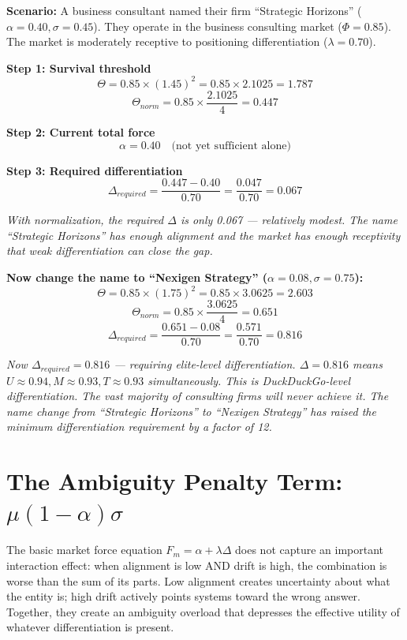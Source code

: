 \documentclass[12pt, openany]{book}
\theoremstyle{thmstyle}
\theoremstyle{defstyle}
\begin{document}
\begin{calcbox}
\textbf{Scenario:} A business consultant named their firm ``Strategic Horizons'' ($\alpha = 0.40, \sigma = 0.45$). They operate in the business consulting market ($\Phi = 0.85$). The market is moderately receptive to positioning differentiation ($\lambda = 0.70$).

\vspace{6pt}
\textbf{Step 1: Survival threshold}
\[
\Theta = 0.85 \times (1.45)^2 = 0.85 \times 2.1025 = 1.787
\]
\[
\Theta_{norm} = 0.85 \times \frac{2.1025}{4} = 0.447
\]

\textbf{Step 2: Current total force}
\[
\alpha = 0.40 \quad \text{(not yet sufficient alone)}
\]

\textbf{Step 3: Required differentiation}
\[
\Delta_{required} = \frac{0.447 - 0.40}{0.70} = \frac{0.047}{0.70} = 0.067
\]

\textit{With normalization, the required $\Delta$ is only 0.067 --- relatively modest. The name ``Strategic Horizons'' has enough alignment and the market has enough receptivity that weak differentiation can close the gap.}

\vspace{6pt}
\textbf{Now change the name to ``Nexigen Strategy'' ($\alpha = 0.08, \sigma = 0.75$):}
\[
\Theta = 0.85 \times (1.75)^2 = 0.85 \times 3.0625 = 2.603
\]
\[
\Theta_{norm} = 0.85 \times \frac{3.0625}{4} = 0.651
\]
\[
\Delta_{required} = \frac{0.651 - 0.08}{0.70} = \frac{0.571}{0.70} = 0.816
\]

\textit{Now $\Delta_{required} = 0.816$ --- requiring elite-level differentiation. $\Delta = 0.816$ means $U \approx 0.94, M \approx 0.93, T \approx 0.93$ simultaneously. This is DuckDuckGo-level differentiation. The vast majority of consulting firms will never achieve it. The name change from ``Strategic Horizons'' to ``Nexigen Strategy'' has raised the minimum differentiation requirement by a factor of 12.}
\end{calcbox}

\section{The Ambiguity Penalty Term: $\mu(1-\alpha)\sigma$}

The basic market force equation $F_m = \alpha + \lambda\Delta$ does not capture an important interaction effect: when alignment is low AND drift is high, the combination is worse than the sum of its parts. Low alignment creates uncertainty about what the entity is; high drift actively points systems toward the wrong answer. Together, they create an ambiguity overload that depresses the effective utility of whatever differentiation is present.
\end{document}
